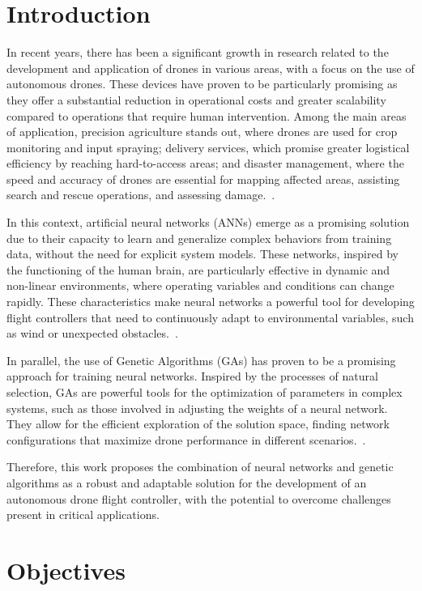 \documentclass[12pt]{article}
\theoremstyle{definition}
\begin{document}
\section{Introduction}
In recent years, there has been a significant growth in research related to the development and application of drones in various areas, with a focus on the use of autonomous drones. These devices have proven to be particularly promising as they offer a substantial reduction in operational costs and greater scalability compared to operations that require human intervention. Among the main areas of application, precision agriculture stands out, where drones are used for crop monitoring and input spraying; delivery services, which promise greater logistical efficiency by reaching hard-to-access areas; and disaster management, where the speed and accuracy of drones are essential for mapping affected areas, assisting search and rescue operations, and assessing damage.~\cite{Agriculture, DeliverySystem, DisasterManagement}.

In this context, artificial neural networks (ANNs) emerge as a promising solution due to their capacity to learn and generalize complex behaviors from training data, without the need for explicit system models. These networks, inspired by the functioning of the human brain, are particularly effective in dynamic and non-linear environments, where operating variables and conditions can change rapidly. These characteristics make neural networks a powerful tool for developing flight controllers that need to continuously adapt to environmental variables, such as wind or unexpected obstacles.~\cite{AutonomousDroneRL}.

In parallel, the use of Genetic Algorithms (GAs) has proven to be a promising approach for training neural networks. Inspired by the processes of natural selection, GAs are powerful tools for the optimization of parameters in complex systems, such as those involved in adjusting the weights of a neural network. They allow for the efficient exploration of the solution space, finding network configurations that maximize drone performance in different scenarios.~\cite{ReviewGeneticAlgorithm, GeneticAlgorithms}.

Therefore, this work proposes the combination of neural networks and genetic algorithms as a robust and adaptable solution for the development of an autonomous drone flight controller, with the potential to overcome challenges present in critical applications.

\section{Objectives}
\end{document}
